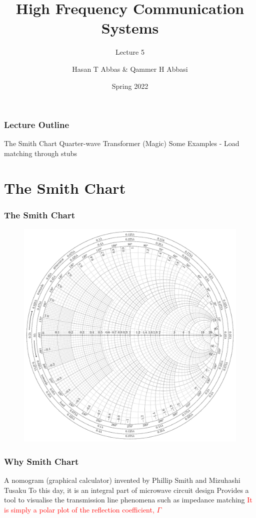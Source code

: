 \documentclass[10pt, compress]{beamer}
\title{High Frequency Communication Systems}
\subtitle{Lecture 5}
\date{Spring 2022}
\author{Hasan T Abbas \& Qammer H Abbasi}
\begin{document}
\maketitle

\begin{frame}[fragile]
    \frametitle{Lecture Outline}
    \begin{outline}[itemize]
        \1 The Smith Chart
        \1 Quarter-wave Transformer (Magic)
        \1 Some Examples - Load matching through stubs
    \end{outline}
\end{frame}

\section{The Smith Chart}


\begin{frame}
    \frametitle{The Smith Chart}
    \begin{figure}[htbp]
        \centering
        \includegraphics[width=.7\textwidth]{smith.pdf}
    \end{figure}
\end{frame}


\begin{frame}
    \frametitle{Why Smith Chart}
    \begin{outline}
        \1 A nomogram (graphical calculator) invented by Phillip Smith and Mizuhashi Tusaku
        \1 To this day, it is an integral part of microwave circuit design
        \1 Provides a tool to visualise the transmission line phenomena such as impedance matching
        \1 \textcolor{red}{It is simply a polar plot of the reflection coefficient, $\Gamma$}
    \end{outline}
\end{frame}
\end{document}
